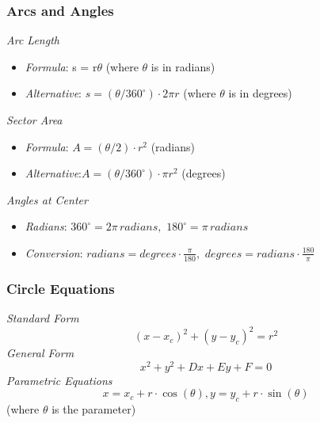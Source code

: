 \documentclass[a4paper,14pt]{article}
\begin{document}
\subsubsection{Arcs and Angles}
\emph{Arc Length}
\begin{itemize}
\item \emph{Formula}: s = r\(\theta\) (where \(\theta\) is in radians)
\item \emph{Alternative}: \( s = ( \theta / 360^{\circ} ) \cdot 2 \pi r \) (where \( \theta \) is in degrees)
\end{itemize}
\emph{Sector Area}
\begin{itemize}
\item \emph{Formula}: \(A = (\theta/2) \cdot r^2\) (radians)\\
\item \emph{Alternative}:\( A = ( \theta / 360^{\circ} ) \cdot \pi r^2 \) (degrees) \\
\end{itemize}
\emph{Angles at Center}
\begin{itemize}
\item \emph{Radians}: \(360^{\circ} = 2\pi\,radians,\,\, 180^{\circ} = \pi\,radians\)
\item \emph{Conversion}: \(radians = degrees \cdot \frac{\pi}{180},\,\, degrees = radians \cdot \frac{180}{\pi}\)
\end{itemize}
\subsubsection{Circle Equations}
\emph{Standard Form}
\[(x - x_c)^2 + (y - y_c)^2 = r^2\]
\emph{General Form}
\[x^2 + y^2 + Dx + Ey + F = 0\]
\emph{Parametric Equations}
\[ x = x_c + r \cdot \cos( \theta ), y = y_c + r \cdot \sin( \theta ) \] (where \(\theta\) is the parameter)
\end{document}
